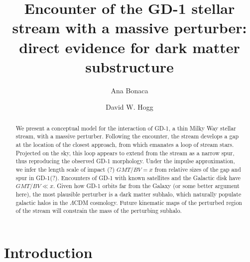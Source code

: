 \documentclass[12pt, modern]{aastex62h}
\begin{document}
\sloppy\sloppypar\raggedbottom\frenchspacing

\noindent
\title{Encounter of the GD-1 stellar stream with a massive perturber: direct evidence for dark matter substructure}


\author[0000-0002-7846-9787]{Ana Bonaca}

\author[0000-0003-2866-9403]{David W. Hogg}

\begin{abstract}\noindent
We present a conceptual model for the interaction of GD-1, a thin Milky Way stellar stream, with a massive perturber.
Following the encounter, the stream develops a gap at the location of the closest approach, from which emanates a loop of stream stars.
Projected on the sky, this loop appears to extend from the stream as a narrow spur, %
thus reproducing the observed GD-1 morphology.
Under the impulse approximation, we infer the length scale of impact (?) $GMT/BV = x$ from relative sizes of the gap and spur in GD-1(?).
Encounters of GD-1 with known satellites and the Galactic disk have $GMT/BV \ll x$.
Given how GD-1 orbits far from the Galaxy (or some better argument here), the most plausible perturber is a dark matter subhalo, which naturally populate galactic halos in the $\Lambda$CDM cosmology.
Future kinematic maps of the perturbed region of the stream will constrain the mass of the perturbing subhalo.

% 
\end{abstract}


\section{Introduction}



% 
\end{document}
